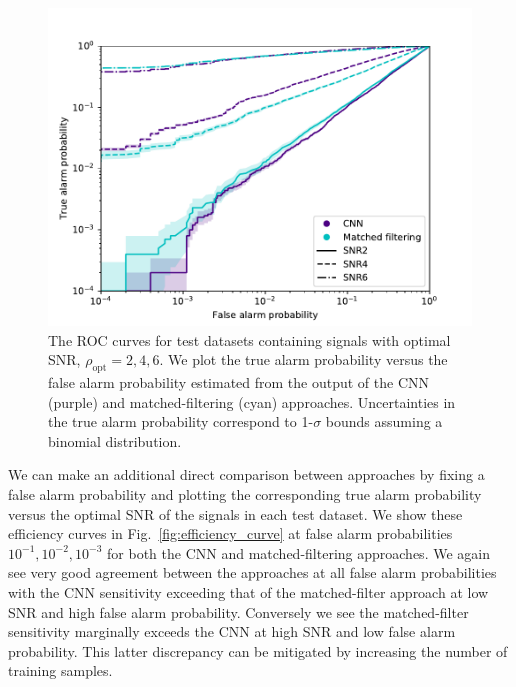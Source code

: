 \documentclass[%
showpacs,
 amsmath,amssymb,
 aps,
 twocolumn,
 prl,
 reprint,
floatfix,
]{revtex4-1}
\begin{document}
%
%
\begin{figure}[]
\includegraphics[width=\columnwidth] {ROC_curves.pdf}
\caption{The \ac{ROC} curves for test datasets containing signals with optimal
\ac{SNR}, $\rho_{\mathrm{opt}}=2,4,6$. We plot the true alarm probability
versus the false alarm probability estimated from the output of the \ac{CNN}
(purple) and matched-filtering (cyan) approaches. Uncertainties in the true
alarm probability correspond to 1-$\sigma$ bounds assuming a binomial
distribution.} \label{fig:ROC_curves} 
\end{figure}

%
%
We can make an additional direct comparison between approaches by fixing a
false alarm probability and plotting the corresponding true alarm probability
versus the optimal \ac{SNR} of the signals in each test dataset. We show these
efficiency curves in Fig.~\ref{fig:efficiency_curve} at false alarm
probabilities $10^{-1},10^{-2},10^{-3}$ for both the \ac{CNN} and
matched-filtering approaches. We again see very good agreement between the
approaches at all false alarm probabilities with the \ac{CNN} sensitivity
exceeding that of the matched-filter approach at low \ac{SNR} and high false
alarm probability. Conversely we see the matched-filter sensitivity marginally
exceeds the \ac{CNN} at high \ac{SNR} and low false alarm probability. This
latter discrepancy can be mitigated by increasing the number of training
samples.

\end{document}
